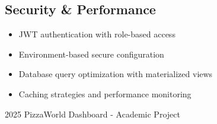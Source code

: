 \documentclass[11pt,a4paper]{article}
\begin{document}
\subsection{Security \& Performance}
\begin{itemize}[leftmargin=*]
    \item JWT authentication with role-based access
    \item Environment-based secure configuration
    \item Database query optimization with materialized views
    \item Caching strategies and performance monitoring
\end{itemize}

\vfill

\begin{center}
{\small \textcopyright{} 2025 PizzaWorld Dashboard - Academic Project}
\end{center}
\end{document}
